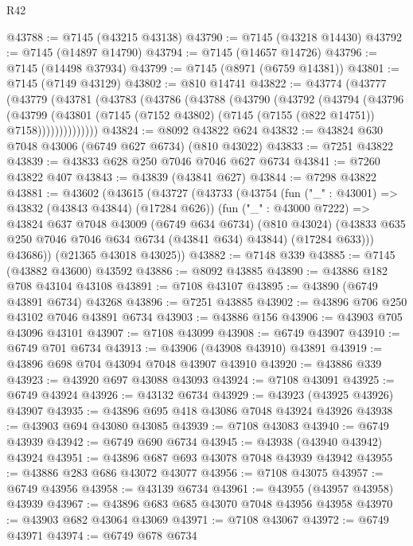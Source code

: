 \begin{lexlean}{R42}
\begin{coremodule}
{@43788 := @7145 (@43215 @43138)
@43790 := @7145 (@43218 @14430)
@43792 := @7145 (@14897 @14790)
@43794 := @7145 (@14657 @14726)
@43796 := @7145 (@14498 @37934)
@43799 := @7145 (@8971 (@6759 @14381))
@43801 := @7145 (@7149 @43129)
@43802 := @810 @14741
@43822 := @43774
    (@43777
      (@43779
        (@43781
          (@43783
            (@43786
              (@43788
                (@43790
                  (@43792
                    (@43794
                      (@43796
                        (@43799
                          (@43801
                            (@7145 (@7152 @43802) (@7145 (@7155 (@822 @14751)) @7158))))))))))))))
@43824 := @8092 @43822 @624
@43832 := @43824 @630 @7048 @43006 (@6749 @627 @6734) (@810 @43022)
@43833 := @7251 @43822
@43839 := @43833 @628 @250 @7046 @7046 @627 @6734
@43841 := @7260 @43822 @407
@43843 := @43839 (@43841 @627)
@43844 := @7298 @43822
@43881 := @43602
    (@43615
      (@43727
        (@43733
          (@43754
            (fun ("_" : @43001) => @43832 (@43843 @43844) (@17284 @626))
            (fun ("_" : @43000 @7222) =>
            @43824
              @637
              @7048
              @43009
              (@6749 @634 @6734)
              (@810 @43024)
              (@43833 @635 @250 @7046 @7046 @634 @6734 (@43841 @634) @43844)
              (@17284 @633)))
          @43686))
      (@21365 @43018 @43025))
@43882 := @7148 @339
@43885 := @7145 (@43882 @43600) @43592
@43886 := @8092 @43885
@43890 := @43886 @182 @708 @43104 @43108
@43891 := @7108 @43107
@43895 := @43890 (@6749 @43891 @6734) @43268
@43896 := @7251 @43885
@43902 := @43896 @706 @250 @43102 @7046 @43891 @6734
@43903 := @43886 @156
@43906 := @43903 @705 @43096 @43101
@43907 := @7108 @43099
@43908 := @6749 @43907
@43910 := @6749 @701 @6734
@43913 := @43906 (@43908 @43910) @43891
@43919 := @43896 @698 @704 @43094 @7048 @43907 @43910
@43920 := @43886 @339
@43923 := @43920 @697 @43088 @43093
@43924 := @7108 @43091
@43925 := @6749 @43924
@43926 := @43132 @6734
@43929 := @43923 (@43925 @43926) @43907
@43935 := @43896 @695 @418 @43086 @7048 @43924 @43926
@43938 := @43903 @694 @43080 @43085
@43939 := @7108 @43083
@43940 := @6749 @43939
@43942 := @6749 @690 @6734
@43945 := @43938 (@43940 @43942) @43924
@43951 := @43896 @687 @693 @43078 @7048 @43939 @43942
@43955 := @43886 @283 @686 @43072 @43077
@43956 := @7108 @43075
@43957 := @6749 @43956
@43958 := @43139 @6734
@43961 := @43955 (@43957 @43958) @43939
@43967 := @43896 @683 @685 @43070 @7048 @43956 @43958
@43970 := @43903 @682 @43064 @43069
@43971 := @7108 @43067
@43972 := @6749 @43971
@43974 := @6749 @678 @6734
}
\end{coremodule}
\end{lexlean}
